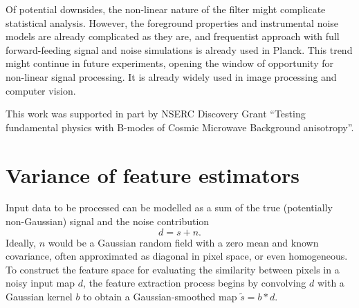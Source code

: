 \documentclass{aa}
\begin{document}
Of potential downsides, the non-linear nature of the filter might complicate statistical analysis. However, the foreground properties and instrumental noise models are already complicated as they are, and frequentist approach with full forward-feeding signal and noise simulations is already used in Planck. This trend might continue in future experiments, opening the window of opportunity for non-linear signal processing. It is already widely used in image processing and computer vision.

\begin{acknowledgements}
This work was supported in part by NSERC Discovery Grant ``Testing fundamental physics with B-modes of Cosmic Microwave Background anisotropy''.
\end{acknowledgements}





\appendix

\section{Variance of feature estimators}
\label{sec:app:variance}

Input data to be processed can be modelled as a sum of the true (potentially non-Gaussian) signal and the noise contribution
%
\begin{equation}
d = s+n.
\end{equation}
%
Ideally, $n$ would be a Gaussian random field with a zero mean and known covariance, often approximated as diagonal in pixel space, or even homogeneous. To construct the feature space for evaluating the similarity between pixels in a noisy input map $d$, the feature extraction process begins by convolving $d$ with a Gaussian kernel $b$ to obtain a Gaussian-smoothed map $\tilde{s}=b*d$.
\end{document}
